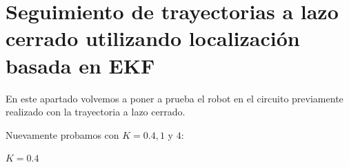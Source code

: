 \section{Seguimiento de trayectorias a lazo cerrado utilizando localización basada en EKF}

En este apartado volvemos a poner a prueba el robot en el circuito previamente realizado con la trayectoria a lazo cerrado.

Nuevamente probamos con $K= 0.4,1$ y $4$:

$K=0.4$











